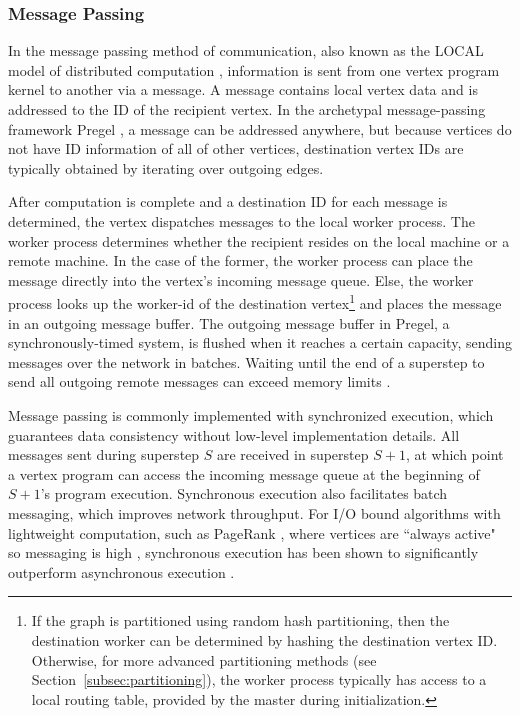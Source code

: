 \documentclass[reprint,twocolumn,showpacs,preprintnumbers,amsmath, aps,pre,amssymb]{revtex4-1}
\begin{document}
\subsubsection{Message Passing}
\label{subsubsec:msg}

In the message passing method of communication, also known as the LOCAL model of distributed computation \cite{Peleg}, information is sent from one vertex program kernel to another via a message. A message contains local vertex data and is addressed to the ID of the recipient vertex.  In the archetypal message-passing framework Pregel \cite{Malewicz2010}, a message can be addressed anywhere, but because vertices do not have ID information of all of other vertices, destination vertex IDs are typically obtained by iterating over outgoing edges.

After computation is complete and a destination ID for each message is determined, the vertex dispatches messages to the local worker process.  The worker process determines whether the recipient resides on the local machine or a remote machine.  In the case of the former, the worker process can place the message directly into the vertex's incoming message queue.  Else, the worker process looks up the worker-id of the destination vertex\footnote{If the graph is partitioned using random hash partitioning, then the destination worker can be determined by hashing the destination vertex ID.  Otherwise, for more advanced partitioning methods (see Section~\ref{subsec:partitioning}), the worker process typically has access to a local routing table, provided by the master during initialization.} and places the message in an outgoing message buffer.  The outgoing message buffer in Pregel, a synchronously-timed system, is flushed when it reaches a certain capacity, sending messages over the network in batches. Waiting until the end of a superstep to send all outgoing remote messages can exceed memory limits \cite{Satish}.

Message passing is commonly implemented with synchronized execution, which guarantees data consistency without low-level implementation details.  All messages sent during superstep $S$ are received in superstep $S+1$, at which point a vertex program can access the incoming message queue at the beginning of $S+1$'s program execution.  Synchronous execution also facilitates batch messaging, which improves network throughput.  For I/O bound algorithms with lightweight computation, such as PageRank \cite{Brin1998}, where vertices are ``always active" so messaging is high \cite{Shang2013}, synchronous execution has been shown to significantly outperform asynchronous execution \cite{Xie2013}.
\end{document}
